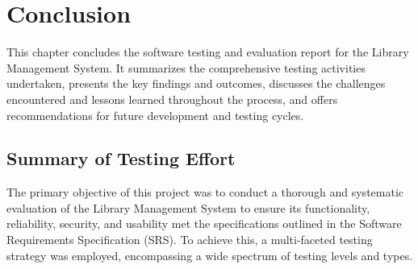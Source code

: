 \chapter{Conclusion}
\label{chap:conclusion}

This chapter concludes the software testing and evaluation report for the Library Management System. It summarizes the comprehensive testing activities undertaken, presents the key findings and outcomes, discusses the challenges encountered and lessons learned throughout the process, and offers recommendations for future development and testing cycles.

\section{Summary of Testing Effort}
\label{sec:summary_of_effort}

The primary objective of this project was to conduct a thorough and systematic evaluation of the Library Management System to ensure its functionality, reliability, security, and usability met the specifications outlined in the Software Requirements Specification (SRS). To achieve this, a multi-faceted testing strategy was employed, encompassing a wide spectrum of testing levels and types.

